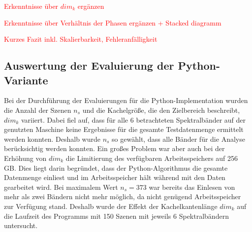 \textcolor{red}{Erkenntnisse über $dim_k$ ergänzen}

\textcolor{red}{Erkenntnisse über Verhältnis der Phasen ergänzen + Stacked diagramm}



\textcolor{red}{Kurzes Fazit inkl. Skalierbarkeit, Fehleranfälligkeit}

\subsection{Auswertung der Evaluierung der Python-Variante}
Bei der Durchführung der Evaluierungen für die Python-Implementation wurden die Anzahl der Szenen $n_s$ und die Kachelgröße, die den Zielbereich beschreibt, $dim_k$ variiert. Dabei fiel auf, dass für alle 6 betrachteten Spektralbänder auf der genutzten Maschine keine Ergebnisse für die gesamte Testdatenmenge ermittelt werden konnten. Deshalb wurde $n_s$ so gewählt, dass alle Bänder für die Analyse berücksichtig werden konnten. Ein großes Problem war aber auch bei der Erhöhung von $dim_k$ die Limitierung des verfügbaren Arbeitsspeichers auf 256 GB. Dies liegt darin begründet, dass der Python-Algorithmus die gesamte Datenmenge einliest und im Arbeitsspeicher hält während mit den Daten gearbeitet wird. Bei maximalem Wert $n_s = 373$ war bereits das Einlesen von mehr als zwei Bändern nicht mehr möglich, da nicht genügend Arbeitsspeicher zur Verfügung stand. Deshalb wurde der Effekt der Kachelkantenlänge $dim_k$ auf die Laufzeit des Programms mit 150 Szenen mit jeweils 6 Spektralbändern untersucht. 
